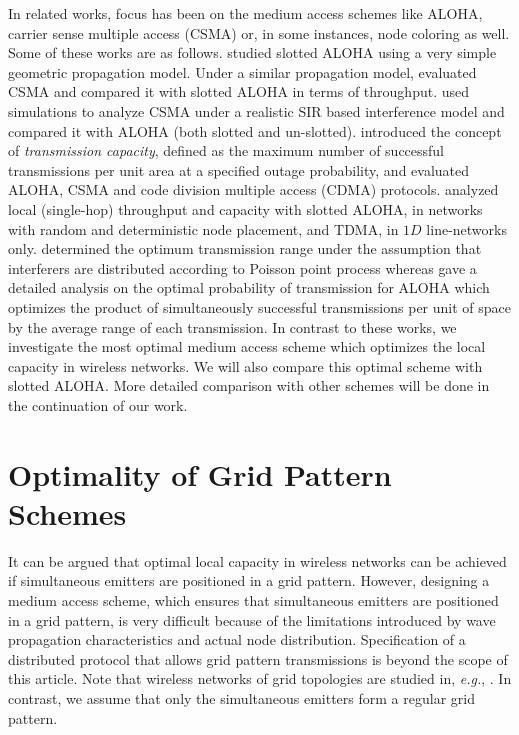 \documentclass[12pt,english]{article}
\begin{document}
In related works, focus has been on the medium access schemes like ALOHA, carrier sense multiple access (CSMA) or, in some instances, node coloring as well. Some of these works are as follows. \cite{Nelson:Kleinrock} studied slotted ALOHA using a very simple geometric propagation model. Under a similar propagation model, \cite{CSMA} evaluated CSMA and compared it with slotted ALOHA in terms of throughput. \cite{Bartek} used simulations to analyze CSMA under a realistic SIR based interference model and compared it with ALOHA (both slotted and un-slotted). \cite{Weber,Weber2,Weber3} introduced the concept of {\em transmission capacity}, defined as the maximum number of successful transmissions per unit area at a specified outage probability, and evaluated ALOHA, CSMA and code division multiple access (CDMA) protocols. \cite{Haenggi} analyzed local (single-hop) throughput and capacity with slotted ALOHA, in networks with random and deterministic node placement, and TDMA, in $1D$ line-networks only. \cite{Zorzi2} determined the optimum transmission range under the assumption that interferers are distributed according to Poisson point process whereas \cite{SR-ALOHA} gave a detailed analysis on the optimal probability of transmission for ALOHA which optimizes the product of simultaneously successful transmissions per unit of space by the average range of each transmission. In contrast to these works, we investigate the most optimal medium access scheme which optimizes the local capacity in wireless networks. We will also compare this optimal scheme with slotted ALOHA. More detailed comparison with other schemes will be done in the continuation of our work.
 
\section{Optimality of Grid Pattern Schemes}
\label{sec:grid_optimality}

It can be argued that optimal local capacity in wireless networks can be achieved if simultaneous emitters are positioned in a grid pattern. However, designing a medium access scheme, which ensures that simultaneous emitters are positioned in a grid pattern, is very difficult because of the limitations introduced by wave propagation characteristics and actual node distribution. Specification of a distributed protocol that allows grid pattern transmissions is beyond the scope of this article. Note that wireless networks of grid topologies are studied in, {\it e.g.}, \cite{Liu:Haenggi,Hong:Hua}. In contrast, we assume that only the simultaneous emitters form a regular grid pattern. 
\end{document}
